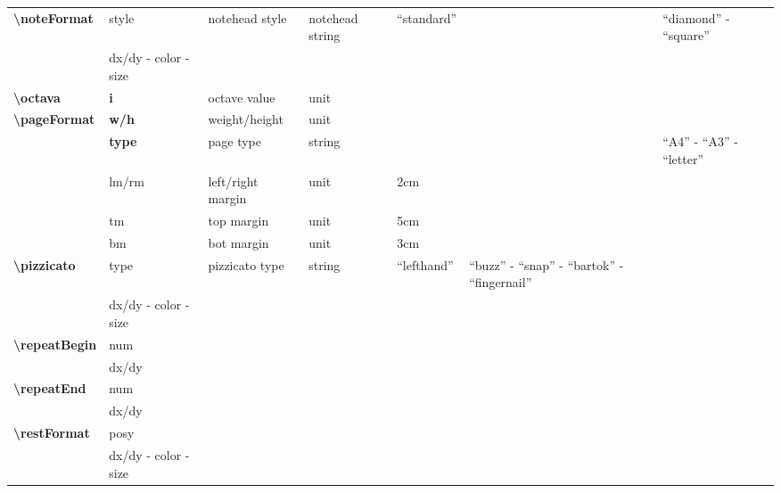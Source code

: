 \documentclass[a4paper, landscape, 10pt]{article}
\begin{document}
\begin{tabularx}{\linewidth}{p{3cm}p{3cm}p{5cm}p{3cm}p{2.5cm}p{3.5cm}p{4cm}}
    \hline
    \textbf{\textbackslash{}noteFormat}&style&notehead style&notehead string&``standard''&&``diamond'' - ``square''\\
	&dx/dy - color - size&&&&&\\
    \hline
    \textbf{\textbackslash{}octava}&\textbf{i}&octave value&unit&&&\\
    \hline
    \textbf{\textbackslash{}pageFormat}&\textbf{w/h}&weight/height&unit&&&\\
    &\textbf{type}&page type&string&&&``A4'' - ``A3'' - ``letter''\\
    &lm/rm&left/right margin&unit&2cm&&\\
    &tm&top margin&unit&5cm&&\\
    &bm&bot margin&unit&3cm&&\\
    \hline
    \textbf{\textbackslash{}pizzicato}&type&pizzicato type&string&``lefthand''&``buzz'' - ``snap'' - ``bartok'' - ``fingernail''&\\
    &dx/dy - color - size&&&&&\\
    \hline
    \textbf{\textbackslash{}repeatBegin}&num&&&&&\\ %
    &dx/dy&&&&&\\
    \hline
    \textbf{\textbackslash{}repeatEnd}&num&&&&&\\ %
    &dx/dy&&&&&\\
    \hline
    \textbf{\textbackslash{}restFormat}&posy&&&&&\\ %
    &dx/dy - color - size&&&&&\\
    \hline
\end{tabularx}
\end{document}
